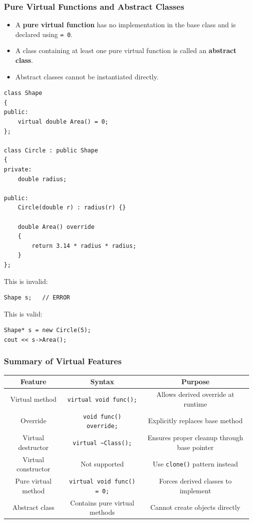 \documentclass[10pt]{article}
\begin{document}
\subsubsection*{Pure Virtual Functions and Abstract Classes}
\begin{itemize}
    \item A \textbf{pure virtual function} has no implementation in the base class and is declared using \verb|= 0|.

    \item A class containing at least one pure virtual function is called an \textbf{abstract class}.

    \item Abstract classes cannot be instantiated directly.
\end{itemize}

\begin{verbatim}
class Shape
{
public:
    virtual double Area() = 0;
};

class Circle : public Shape
{
private:
    double radius;

public:
    Circle(double r) : radius(r) {}

    double Area() override
    {
        return 3.14 * radius * radius;
    }
};
\end{verbatim}

This is invalid:

\begin{verbatim}
Shape s;   // ERROR
\end{verbatim}

This is valid:

\begin{verbatim}
Shape* s = new Circle(5);
cout << s->Area();
\end{verbatim}


\subsubsection*{Summary of Virtual Features}

\begin{center}
\begin{tabular}{|c|c|c|}
\hline
Feature & Syntax & Purpose \\
\hline
Virtual method & \verb|virtual void func();| &
Allows derived override at runtime \\
\hline
Override & \verb|void func() override;| &
Explicitly replaces base method \\
\hline
Virtual destructor & \verb|virtual ~Class();| &
Ensures proper cleanup through base pointer \\
\hline
Virtual constructor & Not supported &
Use \verb|clone()| pattern instead \\
\hline
Pure virtual method & \verb|virtual void func() = 0;| &
Forces derived classes to implement \\
\hline
Abstract class &
Contains pure virtual methods &
Cannot create objects directly \\
\hline
\end{tabular}
\end{center}
\end{document}
